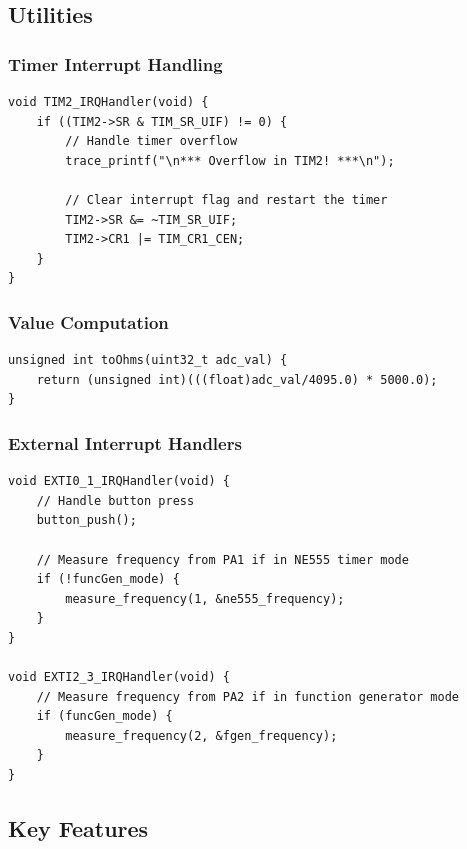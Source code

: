 \subsection{Utilities}
\subsubsection{Timer Interrupt Handling}
\begin{lstlisting}[caption=Timer 2 Interrupt Handler]
void TIM2_IRQHandler(void) {
    if ((TIM2->SR & TIM_SR_UIF) != 0) {
        // Handle timer overflow
        trace_printf("\n*** Overflow in TIM2! ***\n");

        // Clear interrupt flag and restart the timer
        TIM2->SR &= ~TIM_SR_UIF;
        TIM2->CR1 |= TIM_CR1_CEN;
    }
}
\end{lstlisting}

\subsubsection{Value Computation}
\begin{lstlisting}[caption=Resistance Calculation Function]
unsigned int toOhms(uint32_t adc_val) {
    return (unsigned int)(((float)adc_val/4095.0) * 5000.0);
}
\end{lstlisting}

\subsubsection{External Interrupt Handlers}
\begin{lstlisting}[caption=EXTI0 and EXTI2 Handlers]
void EXTI0_1_IRQHandler(void) {
    // Handle button press
    button_push();

    // Measure frequency from PA1 if in NE555 timer mode
    if (!funcGen_mode) {
        measure_frequency(1, &ne555_frequency);
    }
}

void EXTI2_3_IRQHandler(void) {
    // Measure frequency from PA2 if in function generator mode
    if (funcGen_mode) {
        measure_frequency(2, &fgen_frequency);
    }
}
\end{lstlisting}

\subsection{Key Features}

